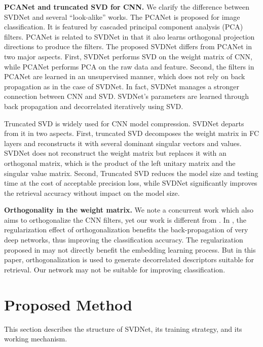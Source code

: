 \documentclass[10pt,twocolumn,letterpaper]{article}
\begin{document}
\textbf{PCANet and truncated SVD for CNN.}
We clarify the difference between SVDNet and several ``look-alike'' works.
The PCANet \cite{DBLP:journals/tip/ChanJGLZM15} is proposed for image classification. It is featured by cascaded principal component analysis (PCA) filters. PCANet is related to SVDNet in that it also learns orthogonal projection directions to produce the filters. The proposed SVDNet  differs from PCANet in two major aspects. First, SVDNet performs SVD on the weight matrix of CNN, while PCANet performs PCA on the raw data and feature. Second, the filters in PCANet are learned in an unsupervised manner, which does not rely on back propagation as in the case of SVDNet. In fact, SVDNet manages a stronger connection between CNN and SVD. SVDNet's parameters are learned through back propagation and decorrelated iteratively using SVD.

Truncated SVD \cite{DBLP:conf/nips/DentonZBLF14,DBLP:conf/interspeech/XueLG13} is widely used for CNN model compression. SVDNet departs from it in two aspects. First, truncated SVD decomposes the weight matrix in FC layers and reconstructs it with several dominant singular vectors and values. SVDNet does not reconstruct the weight matrix but replaces it with an orthogonal matrix, which is the product of the left unitary matrix and the singular value matrix. Second, Truncated SVD reduces the model size and testing time at the cost of acceptable precision loss, while SVDNet significantly improves the retrieval accuracy without impact on the model size.   

\textbf{Orthogonality in the weight matrix.}
We note a concurrent work \cite{DBLP:conf/cvpr/Di17} which also aims to orthogonalize the CNN filters, yet our work is different from \cite{DBLP:conf/cvpr/Di17}. In  \cite{DBLP:conf/cvpr/Di17}, the regularization effect of orthogonalization benefits the back-propagation of very deep networks, thus improving the classification accuracy. The regularization proposed in \cite{DBLP:conf/cvpr/Di17} may not directly benefit the embedding learning process. But in this paper, orthogonalization is used to generate decorrelated descriptors suitable for retrieval. Our network may not be suitable for improving classification. 



\section{Proposed Method}
This section describes the structure of SVDNet, its training strategy, and its working mechanism.
\end{document}
